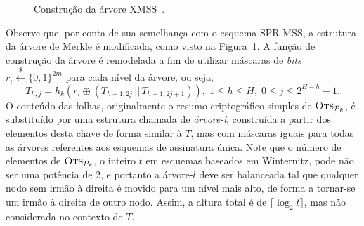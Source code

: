 \documentclass[12pt]{report}
\newcommand{\pk}{\mathcal{P}_k}
\newcommand{\concat}{\, \vert \vert \,}
\newcommand{\binwds}[1]{\{0, 1\}^{#1}}
\begin{document}
\begin{figure}
    \centering
    \caption{Construção da árvore XMSS~\cite{Buchmann:2011:XPF:2184003.2184011}.}
    \label{fig:8}
\end{figure}

Observe que, por conta de sua semelhança com o esquema SPR-MSS, a estrutura da árvore de Merkle é modificada, como visto na Figura~\ref{fig:8}. A função de construção da árvore é remodelada a fim de utilizar máscaras de \emph{bits} $r_i \stackrel{\$}{\longleftarrow} \binwds{2m}$ para cada nível da árvore, ou seja,
\begin{equation}
    T_{h, j} = h_k(r_i \oplus (T_{h - 1, 2j} \concat T_{h - 1, 2j + 1})),
      \; 1 \leq h \leq H, \; 0 \leq j \leq 2^{H - h} - 1.
\end{equation}
O conteúdo das folhas, originalmente o resumo criptográfico simples de $\textsc{Ots}_{\pk{}}$, é substituído por uma estrutura chamada de \emph{árvore-l}, construída a partir dos elementos desta chave de forma similar à $T$, mas com máscaras iguais para todas as árvores referentes aos esquemas de assinatura única. Note que o número de elementos de $\textsc{Ots}_{\pk{}}$, o inteiro $t$ em esquemas baseados em Winternitz, pode não ser uma potência de 2, e portanto a árvore-$l$ deve ser balanceada tal que qualquer nodo sem irmão à direita é movido para um nível mais alto, de forma a tornar-se um irmão à direita de outro nodo. Assim, a altura total é de $\lceil \log_{2} t \rceil$, mas não considerada no contexto de $T$.
\end{document}
